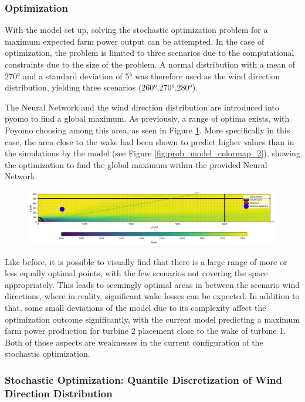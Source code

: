 \subsubsection{Optimization}

With the model set up, solving the stochastic optimization problem for a maximum expected farm power output can be attempted. In the case of optimization, the problem is limited to three scenarios due to the computational constraints due to the size of the problem. A normal distribution with a mean of 270° and  a standard deviation of 5° was therefore used as the wind direction distribution, yielding three scenarios (260°,270°,280°).

The Neural Network and the wind direction distribution are introduced into pyomo to find a global maximum. As previously, a range of optima exists, with Poyomo choosing among this area, as seen in Figure \ref{fig:prob_data_lininter}. More specifically in this case, the area close to the wake had been shown to predict higher values than in the simulations by the model (see Figure \ref{fig:prob_model_colormap_2}), showing the optimization to find the global maximum within the provided Neural Network. 

\begin{figure}[h] 
	\centering
	\includegraphics[width=1\textwidth]{../figures/optimization/prob_data_lininter.png} 
	\caption{}
	\label{fig:prob_data_lininter}
\end{figure}

Like before, it is possible to visually find that there is a large range of more or less equally optimal points, with the few scenarios not covering the space appropriately. This leads to seemingly optimal areas in between the scenario wind directions, where in reality, significant wake losses can be expected. In addition to that, some small deviations of the model due to its complexity affect the optimization outcome significantly, with the current model predicting a maximum farm power production for turbine 2 placement close to the wake of turbine 1. Both of those aspects are weaknesses in the current configuration of the stochastic optimization.
	
\subsubsection{Stochastic Optimization: Quantile Discretization of Wind Direction Distribution } \label{subsubsection: discretization}

